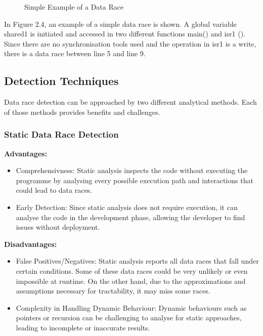 \documentclass[
fancyheadings, %
%
%
]{stsreprt}
\begin{document}
{\begin{figure}[H]
\begin{algorithm}[H]
		\BlankLine
		
		\BlankLine
	\end{algorithm}
	\caption{Simple Example of a Data Race}
\end{figure}

In Figure 2.4, an example of a simple data race is shown. A global variable shared1 is initiated and accessed in two different functions main() and isr1 (). Since there are no synchronisation tools used and the operation in isr1 is a write, there is a data race between line 5 and line 9.


\subsection{Detection Techniques}

Data race detection can be approached by two different analytical methods. Each of those methods provides benefits and challenges.

\subsubsection{Static Data Race Detection \cite{wang2020}}
\textbf{Advantages:}
\begin{itemize}
	\item Comprehensivness: Static analysis inspects the code without executing the programme by analysing every possible execution path and interactions that could lead to data races. 
	\item Early Detection: Since static analysis does not require execution, it can analyse the code in the development phase, allowing the developer to find issues without deployment.
\end{itemize}
\textbf{Disadvantages:}
\begin{itemize}
	\item False Positives/Negatives: Static analysis reports all data races that fall under certain conditions. Some of these data races could be very unlikely or even impossible at runtime. On the other hand, due to the approximations and assumptions necessary for tractability, it may miss some races.
	\item Complexity in Handling Dynamic Behaviour: Dynamic behaviours such as pointers or recursion can be challenging to analyse for static approaches, leading to incomplete or inaccurate results.
\end{itemize}

}
\end{document}
